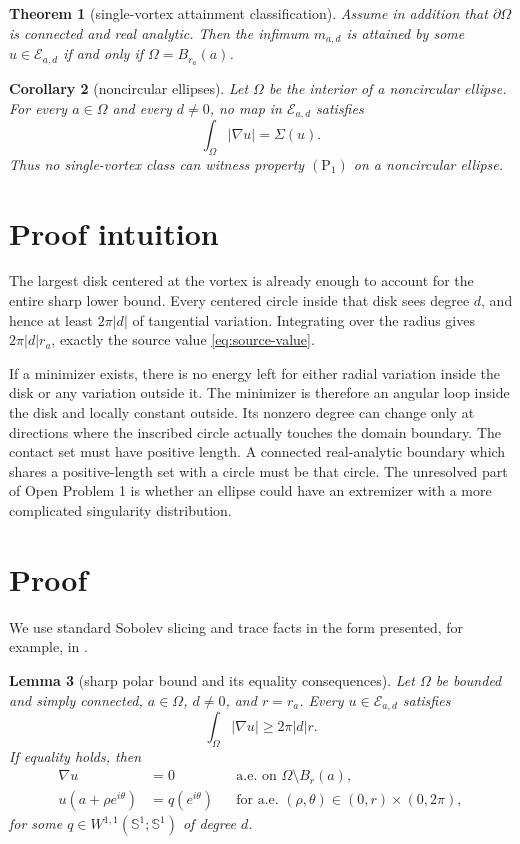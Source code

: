 \documentclass[11pt]{article}
\newtheorem{theorem}{Theorem}
\newtheorem{corollary}[theorem]{Corollary}
\newtheorem{lemma}[theorem]{Lemma}
\newcommand{\Sone}{\mathbb S^1}
\newcommand{\Ead}{\mathcal E_{a,d}}
\begin{document}
\begin{theorem}[single-vortex attainment classification]\label{thm:main}
Assume in addition that $\partial\Omega$ is connected and real analytic.
Then the infimum $m_{a,d}$ is attained by some $u\in\Ead$ if and only if
$\Omega=B_{r_a}(a)$.
\end{theorem}

\begin{corollary}[noncircular ellipses]\label{cor:ellipse}
Let $\Omega$ be the interior of a noncircular ellipse. For every
$a\in\Omega$ and every $d\ne0$, no map in $\Ead$ satisfies
\[
 \int_\Omega|\nabla u|=\Sigma(u).
\]
Thus no single-vortex class can witness property $(\mathrm P_1)$ on a
noncircular ellipse.
\end{corollary}

\section{Proof intuition}

The largest disk centered at the vortex is already enough to account for the
entire sharp lower bound. Every centered circle inside that disk sees degree
$d$, and hence at least $2\pi|d|$ of tangential variation. Integrating over
the radius gives $2\pi|d|r_a$, exactly the source value
\eqref{eq:source-value}.

If a minimizer exists, there is no energy left for either radial variation
inside the disk or any variation outside it. The minimizer is therefore an
angular loop inside the disk and locally constant outside. Its nonzero degree
can change only at directions where the inscribed circle actually touches the
domain boundary. The contact set must have positive length. A connected
real-analytic boundary which shares a positive-length set with a circle must
be that circle. The unresolved part of Open Problem 1 is whether an ellipse
could have an extremizer with a more complicated singularity distribution.

\section{Proof}

We use standard Sobolev slicing and trace facts in the form presented, for
example, in \cite{Leoni}.

\begin{lemma}[sharp polar bound and its equality consequences]\label{lem:polar}
Let $\Omega$ be bounded and simply connected, $a\in\Omega$, $d\ne0$, and
$r=r_a$. Every $u\in\Ead$ satisfies
\begin{equation}\label{eq:polar-bound}
 \int_\Omega|\nabla u|\ge 2\pi|d|r.
\end{equation}
If equality holds, then
\begin{align}
 \nabla u&=0 &&\text{a.e. on }\Omega\setminus B_r(a),
 \label{eq:outside-zero}\\
 u(a+\rho e^{i\theta})&=q(e^{i\theta})
 &&\text{for a.e. }(\rho,\theta)\in(0,r)\times(0,2\pi),
 \label{eq:angular-form}
\end{align}
for some $q\in W^{1,1}(\Sone;\Sone)$ of degree $d$.
\end{lemma}
\end{document}
